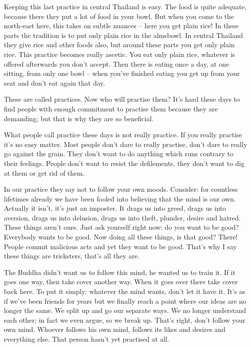 Keeping this last practice in central Thailand is easy. The food is quite adequate, because there they put a lot of food in your bowl. But when you come to the north-east here, this  takes on subtle nuances -- here you get plain rice! In these parts the tradition is to put only plain rice in the almsbowl. In central Thailand they give rice and other foods also, but around these parts you get only plain rice. This  practice becomes really ascetic. You eat only plain rice, whatever is offered afterwards you don't accept. Then there is eating once a day, at one sitting, from only one bowl -- when you've finished eating you get up from your seat and don't eat again that day.

These are called  practices. Now who will practise them? It's hard these days to find people with enough commitment to practise them because they are demanding; but that is why they are so beneficial.

What people call practice these days is not really practice. If you really practise it's no easy matter. Most people don't dare to really practise, don't dare to really go against the grain. They don't want to do anything which runs contrary to their feelings. People don't want to resist the defilements, they don't want to dig at them or get rid of them.

In our practice they say not to follow your own moods. Consider: for countless lifetimes already we have been fooled into believing that the mind is our own. Actually it isn't, it's just an imposter. It drags us into greed, drags us into aversion, drags us into delusion, drags us into theft, plunder, desire and hatred. These things aren't ours. Just ask yourself right now: do you want to be good? Everybody wants to be good. Now doing all these things, is that good? There! People commit malicious acts and yet they want to be good. That's why I say these things are tricksters, that's all they are.

The Buddha didn't want us to follow this mind, he wanted us to train it. If it goes one way, then take cover another way. When it goes over there take cover back here. To put it simply: whatever the mind wants, don't let it have it. It's as if we've been friends for years but we finally reach a point where our ideas are no longer the same. We split up and go our separate ways. We no longer understand each other; in fact we even argue, so we break up. That's right, don't follow your own mind. Whoever follows his own mind, follows its likes and desires and everything else. That person hasn't yet practised at all.


